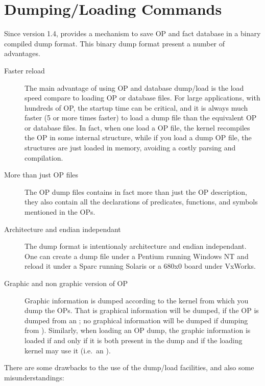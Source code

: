 \section{\CPK{} Dumping/Loading Commands}

Since version 1.4, \COPRS{} provides a mechanism to save OP and fact database in
a binary compiled dump format. This binary dump format present a number of
advantages.

\begin{description}

\item[Faster reload] The main advantage of using OP and database dump/load is
the load speed compare to loading OP or database files. For large applications,
with hundreds of OP, the startup time can be critical, and it is always much
faster (5 or more times faster) to load a dump file than the equivalent OP
or database files. In fact, when one load a OP file, the kernel recompiles the
OP in some internal structure, while if you load a dump OP file, the structures
are just loaded in memory, avoiding a costly parsing and compilation.

\item[More than just OP files] The OP dump files contains in fact more than
just the OP description, they also contain all the declarations of predicates,
functions, and symbols mentioned in the OPs.

\item[Architecture and endian independant] The dump format is intentionaly
architecture and endian independant. One can create a dump file under a Pentium
running Windows NT and reload it under a Sparc running Solaris or a 680x0 board
under VxWorks.

\item[Graphic and non graphic version of OP] Graphic information is dumped
according to the kernel from which you dump the OPs.  That is graphical
information will be dumped, if the OP is dumped from 
an \XPK{}; no graphical information will be dumped if dumping from \aCPK{}). 
Similarly, when loading an OP dump, the
graphic information is loaded if and only if it is both present in the dump and if
the loading kernel may use it (i.e.\ an \XPK{}).

\end{description}

There are some drawbacks to the use of the dump/load facilities, and also some
misunderstandings:

